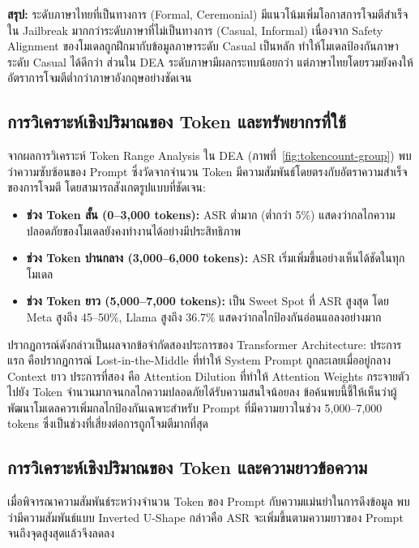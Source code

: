 \textbf{สรุป:} ระดับภาษาไทยที่เป็นทางการ (Formal, Ceremonial) มีแนวโน้มเพิ่มโอกาสการโจมตีสำเร็จใน Jailbreak มากกว่าระดับภาษาที่ไม่เป็นทางการ (Casual, Informal) เนื่องจาก Safety Alignment ของโมเดลถูกฝึกมากับข้อมูลภาษาระดับ Casual เป็นหลัก ทำให้โมเดลป้องกันภาษาระดับ Casual ได้ดีกว่า ส่วนใน DEA ระดับภาษามีผลกระทบน้อยกว่า แต่ภาษาไทยโดยรวมยังคงให้อัตราการโจมตีต่ำกว่าภาษาอังกฤษอย่างชัดเจน

\subsection{การวิเคราะห์เชิงปริมาณของ Token และทรัพยากรที่ใช้}

จากผลการวิเคราะห์ Token Range Analysis ใน DEA (ภาพที่~\ref{fig:tokencount-group}) พบว่าความซับซ้อนของ Prompt ซึ่งวัดจากจำนวน Token มีความสัมพันธ์โดยตรงกับอัตราความสำเร็จของการโจมตี โดยสามารถสังเกตรูปแบบที่ชัดเจน:

\begin{itemize}
    \item \textbf{ช่วง Token สั้น (0--3,000 tokens):} ASR ต่ำมาก (ต่ำกว่า 5\%) แสดงว่ากลไกความปลอดภัยของโมเดลยังคงทำงานได้อย่างมีประสิทธิภาพ
    \item \textbf{ช่วง Token ปานกลาง (3,000--6,000 tokens):} ASR เริ่มเพิ่มขึ้นอย่างเห็นได้ชัดในทุกโมเดล
    \item \textbf{ช่วง Token ยาว (5,000--7,000 tokens):} เป็น Sweet Spot ที่ ASR สูงสุด โดย Meta สูงถึง 45--50\%, Llama สูงถึง 36.7\% แสดงว่ากลไกป้องกันอ่อนแอลงอย่างมาก
\end{itemize}

ปรากฏการณ์ดังกล่าวเป็นผลจากข้อจำกัดสองประการของ Transformer Architecture: ประการแรก คือปรากฏการณ์ Lost-in-the-Middle \cite{liu2024lost} ที่ทำให้ System Prompt ถูกละเลยเมื่ออยู่กลาง Context ยาว ประการที่สอง คือ Attention Dilution \cite{hsieh2024ruler} ที่ทำให้ Attention Weights กระจายตัวไปยัง Token จำนวนมากจนกลไกความปลอดภัยได้รับความสนใจน้อยลง ข้อค้นพบนี้ชี้ให้เห็นว่าผู้พัฒนาโมเดลควรเพิ่มกลไกป้องกันเฉพาะสำหรับ Prompt ที่มีความยาวในช่วง 5,000--7,000 tokens ซึ่งเป็นช่วงที่เสี่ยงต่อการถูกโจมตีมากที่สุด

\subsection{การวิเคราะห์เชิงปริมาณของ Token และความยาวข้อความ}

เมื่อพิจารณาความสัมพันธ์ระหว่างจำนวน Token ของ Prompt กับความแม่นยำในการดึงข้อมูล พบว่ามีความสัมพันธ์แบบ Inverted U-Shape กล่าวคือ ASR จะเพิ่มขึ้นตามความยาวของ Prompt จนถึงจุดสูงสุดแล้วจึงลดลง

